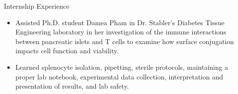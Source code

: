 \documentclass{resume} %
\begin{document}
\begin{workSection}{Internship Experience}
    \experienceItem[
        company=J. Crayton Pruitt Family Department of Biomedical Engineering,
        position=UG Research Internship,
        duration=Summer 2023
    ]
     \begin{itemize}
        \itemsep -6pt {} 
        \item  Assisted Ph.D. student Damea Pham in Dr. Stabler’s Diabetes Tissue Engineering laboratory in her investigation of the immune interactions between pancreatic islets and T cells to examine how surface conjugation impacts cell function and viability.
        \item Learned splenocyte isolation, pipetting, sterile protocols, maintaining a proper lab notebook, experimental data collection, interpretation and presentation of results, and lab safety.
     \end{itemize}
     
     
\end{workSection}
\end{document}
